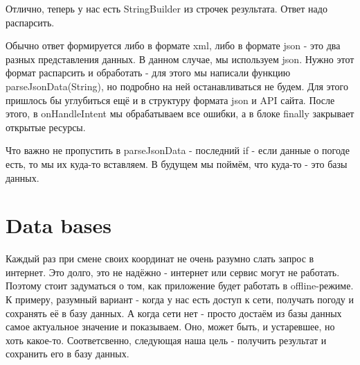 \documentclass[12 pt]{article}
\begin{document}
    Отлично, теперь у нас есть StringBuilder из строчек результата. Ответ надо распарсить.
    
    Обычно ответ формируется либо в формате xml, либо в формате json - это два разных представления данных. В данном случае, мы используем json. Нужно этот формат распарсить и обработать - для этого мы написали функцию parseJsonData(String), но подробно на ней останавливаться не будем. Для этого пришлось бы углубиться ещё и в структуру формата json и API сайта. После этого, в onHandleIntent мы обрабатываем все ошибки, а в блоке finally закрывает открытые ресурсы.
    
    Что важно не пропустить в parseJsonData - последний if - если данные о погоде есть, то мы их куда-то вставляем. В будущем мы поймём, что куда-то - это базы данных.

\section{Data bases}
    
    Каждый раз при смене своих координат не очень разумно слать запрос в интернет. Это долго, это не надёжно - интернет или сервис могут не работать. Поэтому стоит задуматься о том, как приложение будет работать в offline-режиме. К примеру, разумный вариант - когда у нас есть доступ к сети, получать погоду и сохранять её в базу данных. А когда сети нет - просто достаём из базы данных самое актуальное значение и показываем. Оно, может быть, и устаревшее, но хоть какое-то. Соответсвенно, следующая наша цель - получить результат и сохранить его в базу данных.
    
\end{document}
